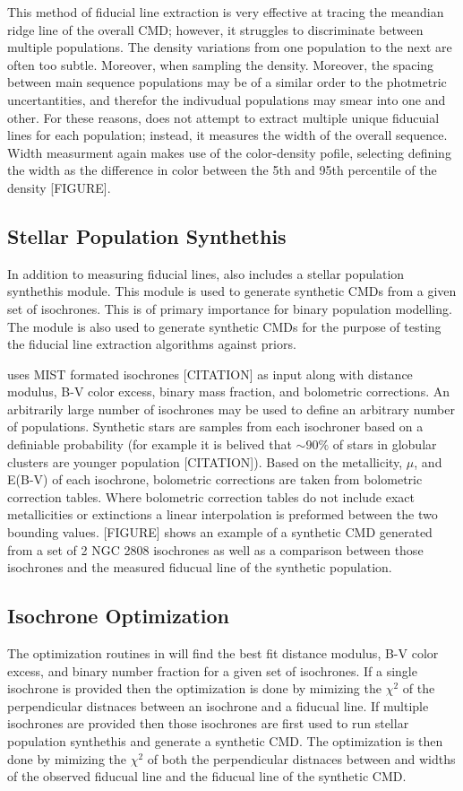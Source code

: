 This method of fiducial line extraction is very effective at tracing the
meandian ridge line of the overall CMD; however, it struggles to discriminate
between multiple populations. The density variations from one population to the
next are often too subtle. Moreover, when sampling the density. Moreover, the
spacing between main sequence populations may be of a similar order to the
photmetric uncertantities, and therefor the indivudual populations may smear
into one and other. For these reasons, \fidanka does not attempt to extract
multiple unique fiducuial lines for each population; instead, it measures the
width of the overall sequence. Width measurment again makes use of the
color-density pofile, selecting defining the width as the difference in color
between the 5th and 95th percentile of the density {\color{red}[FIGURE]}.

\subsection{Stellar Population Synthethis}
In addition to measuring fiducial lines, \fidanka also includes a stellar
population synthethis module. This module is used to generate synthetic CMDs
from a given set of isochrones. This is of primary importance for binary
population modelling. The module is also used to generate synthetic CMDs for
the purpose of testing the fiducial line extraction algorithms against priors.

\fidanka uses MIST formated isochrones {\color{red}[CITATION]} as input along
with distance modulus, B-V color excess, binary mass fraction, and bolometric
corrections. An arbitrarily large number of isochrones may be used to define an
arbitrary number of populations. Synthetic stars are samples from each
isochroner based on a definiable probability (for example it is belived that
$\sim90\%$ of stars in globular clusters are younger population
{\color{red}[CITATION]}). Based on the metallicity, $\mu$, and E(B-V) of each
isochrone, bolometric corrections are taken from bolometric correction tables.
Where bolometric correction tables do not include exact metallicities or
extinctions a linear interpolation is preformed between the two bounding
values. {\color{red}[FIGURE]} shows an example of a synthetic CMD generated
from a set of 2 NGC 2808 isochrones as well as a comparison between those
isochrones and the measured fiducual line of the synthetic population.

\subsection{Isochrone Optimization}
The optimization routines in \fidanka will find the best fit distance modulus,
B-V color excess, and binary number fraction for a given set of isochrones. If
a single isochrone is provided then the optimization is done by mimizing the
$\chi^2$ of the perpendicular distnaces between an isochrone and a fiducual
line. If multiple isochrones are provided then those isochrones are first used
to run stellar population synthethis and generate a synthetic CMD. The
optimization is then done by mimizing the $\chi^2$ of both the perpendicular
distnaces between and widths of the observed fiducual line and the fiducual
line of the synthetic CMD.



